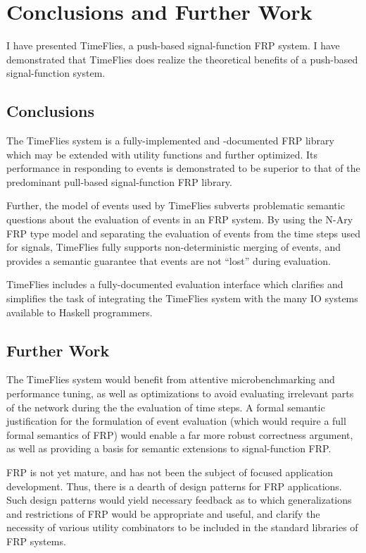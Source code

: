 \chapter{Conclusions and Further Work}
\label{chapter:Conclusions_and_Further_Work}
I have presented TimeFlies, a push-based signal-function FRP system. I have
demonstrated that TimeFlies does realize the theoretical benefits of a
push-based signal-function system.

\section{Conclusions}
\label{section:Conclusions_and_Further_Work-Conclusions}
The TimeFlies system is a fully-implemented and -documented FRP library which
may be extended with utility functions and further optimized. Its performance in
responding to events is demonstrated to be superior to that of the predominant
pull-based signal-function FRP library.

Further, the model of events used by TimeFlies subverts problematic semantic
questions about the evaluation of events in an FRP system. By using the N-Ary
FRP type model and separating the evaluation of events from the time steps used
for signals, TimeFlies fully supports non-deterministic merging of events,
and provides a semantic guarantee that events are not ``lost'' during evaluation.

TimeFlies includes a fully-documented evaluation interface which clarifies and
simplifies the task of integrating the TimeFlies system with the many IO systems
available to Haskell programmers.

\section{Further Work}
\label{section:Conclusions_and_Further_Work-Further_Work}
The TimeFlies system would benefit from attentive microbenchmarking and performance
tuning, as well as optimizations to avoid evaluating irrelevant parts of the network
during the the evaluation of time steps. A formal semantic justification for the
formulation of event evaluation (which would require a full formal semantics of FRP)
would enable a far more robust correctness argument, as well as providing a basis for
semantic extensions to signal-function FRP.

FRP is not yet mature, and has not been the subject of focused application development.
Thus, there is a dearth of design patterns for FRP applications. Such design patterns
would yield necessary feedback as to which generalizations and restrictions of FRP would
be appropriate and useful, and clarify the necessity of various utility combinators to
be included in the standard libraries of FRP systems.

